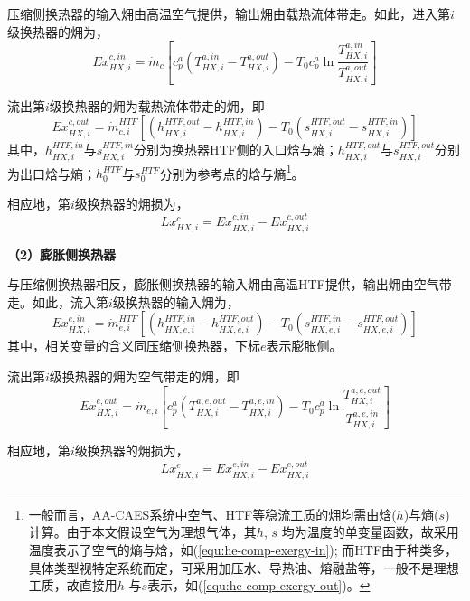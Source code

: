 压缩侧换热器的输入㶲由高温空气提供，输出㶲由载热流体带走。如此，进入第$i$级换热器的㶲为，
\begin{equation}
\label{equ:he-comp-exergy-in}
Ex_{HX,i}^{c,in} = {\dot m_c}[ {c_p^a({T_{HX,i}^{a,in} - T_{HX,i}^{a,out}}) - {T_0}c_p^a\ln \frac{{T_{HX,i}^{a,in}}}{{T_{HX,i}^{a,out}}}}]
\end{equation}

流出第$i$级换热器的㶲为载热流体带走的㶲，即
\begin{equation}
\label{equ:he-comp-exergy-out}
Ex_{HX,i}^{c,out} = \dot m_{c,i}^{HTF}\left[ {({h_{HX,i}^{HTF,out} - h_{HX,i}^{HTF,in}}) - {T_0}({s_{HX,i}^{HTF,out} - s_{HX,i}^{HTF,in}})}\right]
\end{equation}
其中，$h_{HX,i}^{HTF,in}$与$s_{HX,i}^{HTF,in}$分别为换热器HTF侧的入口焓与熵；$h_{HX,i}^{HTF,out}$与$s_{HX,i}^{HTF,out}$分别为出口焓与熵；$h_{0}^{HTF}$与$s_{0}^{HTF}$分别为参考点的焓与熵\footnote{一般而言，AA-CAES系统中空气、HTF等稳流工质的㶲均需由焓($h$)与熵($s$) 计算。由于本文假设空气为理想气体，其$h$, $s$ 均为温度的单变量函数，故采用温度表示了空气的熵与焓，如(\ref{equ:he-comp-exergy-in}); 而HTF由于种类多，具体类型视特定系统而定，可采用加压水、导热油、熔融盐等，一般不是理想工质，故直接用$h$ 与$s$表示，如(\ref{equ:he-comp-exergy-out})。}。

相应地，第$i$级换热器的㶲损为，
\label{equ:he-comp-exergy-loss}
\begin{equation}
Lx_{HX,i}^c = Ex_{HX,i}^{c,in} - Ex_{HX,i}^{c,out}
\end{equation}

\textbf{（2）膨胀侧换热器}

与压缩侧换热器相反，膨胀侧换热器的输入㶲由高温HTF提供，输出㶲由空气带走。如此，流入第$i$级换热器的输入㶲为，
\begin{equation}
\label{equ:he-turb-exergy-in}
Ex_{HX,i}^{e,in} = \dot m_{e,i}^{HTF}\left[{({h_{HX,e,i}^{HTF,in} - h_{HX,e,i}^{HTF,out}}) - {T_0}({s_{HX,e,i}^{HTF,in} - s_{HX,e,i}^{HTF,out}})}\right]
\end{equation}
其中，相关变量的含义同压缩侧换热器，下标$e$表示膨胀侧。

流出第$i$级换热器的㶲为空气带走的㶲，即
\begin{equation}
\label{equ:he-turb-exergy-out}
Ex_{HX,i}^{e,out} = {\dot m_{e,i}}[ {c_p^a({T_{HX,i}^{a,e,out} - T_{HX,i}^{a,e,in}}) - {T_0}c_p^a\ln \frac{{T_{HX,i}^{a,e,out}}}{{T_{HX,i}^{a,e,in}}}}]
\end{equation}

相应地，第$i$级换热器的㶲损为，
\begin{equation}
\label{equ:he-turb-exergy-loss}
Lx_{HX,i}^e = Ex_{HX,i}^{e,in} - Ex_{HX,i}^{e,out}
\end{equation}

